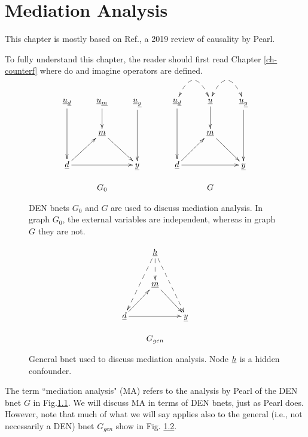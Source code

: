 \chapter{Mediation Analysis}
\label{ch-mediation}
This chapter is mostly based on 
Ref.\cite{pearl-2019review}, a 2019
 review of causality by Pearl.

To fully
understand this chapter,
the reader should first read Chapter \ref{ch-counterf}
where do and imagine operators are defined.


\begin{figure}[h!]
$$
\begin{array}{ccc}
\\
\xymatrix{
\rvu_\rvd\ar[dd]
&\rvu_\rvm\ar[d]
&\rvu_\rvy\ar[dd]
\\
&\rvm\ar[rd]
\\
\rvd\ar[ru]\ar[rr]&&\rvy
}
&\;\;\;\;&
\xymatrix{
\rvu_\rvd\ar[dd]\ar@/^2pc/@{<-->}[r]
&\rvu\ar[d]\ar@/^2pc/@{<-->}[r]
&\rvu_\rvy\ar[dd]
\\
&\rvm\ar[rd]
\\
\rvd\ar[ru]\ar[rr]&&\rvy
}
\\
\\
G_0&&G
\end{array}
$$
\caption{DEN bnets $G_0$ and $G$
are used to 
discuss mediation analysis.
In graph
$G_0$,
the external
variables are independent,
whereas in graph $G$
they are not.}
\label{fig-mediation-bnets}
\end{figure}

\begin{figure}[h!]
$$
\begin{array}{c}
\xymatrix{
&\rvh
\ar@{-->}[d]
\ar@{-->}[ldd]
\ar@{-->}[rdd]
\\
&\rvm\ar[rd]
\\
\rvd\ar[ru]\ar[rr]&&\rvy
}
\\
\\
G_{gen}
\end{array}
$$
\caption{General bnet used to 
discuss mediation analysis.
Node ${\underline{h}}$ is a hidden confounder.}
\label{fig-gen-bnet-mediation}
\end{figure}

The term ``mediation analysis" (MA)
refers
to  the analysis by Pearl
of the DEN bnet
$G$
in Fig.\ref{fig-mediation-bnets}.
We will discuss MA in terms
of DEN bnets, just as Pearl does.
However, note that much of 
what we will say applies also to 
the general (i.e., not
necessarily a DEN) bnet $G_{gen}$
show in Fig. \ref{fig-gen-bnet-mediation}.



